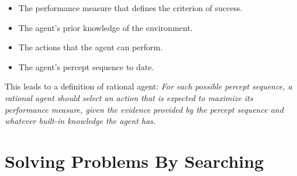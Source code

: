 \documentclass{article}
\begin{document}
\begin{itemize}
    \item The performance measure that defines the criterion of success.
    \item The agent's prior knowledge of the environment.
    \item The actions that the agent can perform.
    \item The agent's percept sequence to date.
\end{itemize}

This leads to a definition of rational agent: \textit{For each possible percept sequence, a rational agent should select an action that is expected to maximize its performance measure, given the evidence provided by the percept sequence and whatever built-in knowledge the agent has.}

\section{Solving Problems By Searching}
\end{document}
